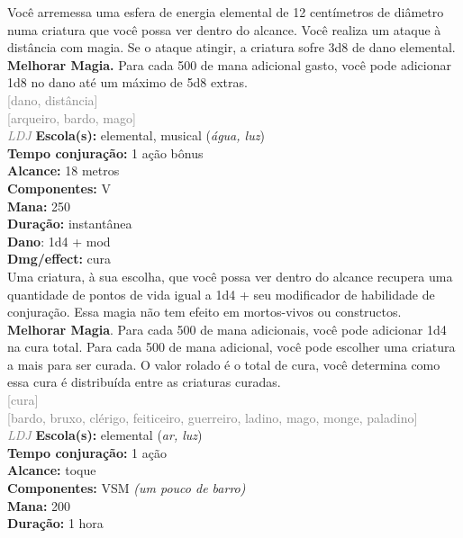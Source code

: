 \documentclass{RPG_Adventure}[2021/10/20]
\begin{document}
{\normalsize Você arremessa uma esfera de energia elemental de 12 centímetros de diâmetro numa criatura que você possa ver dentro do alcance. Você realiza um ataque à distância com magia. Se o ataque atingir, a criatura sofre 3d8 de dano elemental.\\\t \textbf{Melhorar Magia.} Para cada 500 de mana adicional gasto, você pode adicionar 1d8 no dano até um máximo de 5d8 extras.\\}
{\scriptsize \textcolor{gray}{[dano, distância]\\}}
{\scriptsize \textcolor{gray}{[arqueiro, bardo, mago]\\}}
{\tiny \textcolor{gray}{\textit{LDJ}}}
{\small \t \textbf{Escola(s):} elemental, musical (\textit{água, luz})\\\t \textbf{Tempo conjuração:} 1 ação bônus\\\t \textbf{Alcance:} 18 metros\\\t \textbf{Componentes:} V\\\t \textbf{Mana:} 250\\\t \textbf{Duração:} instantânea\\\t \textbf{Dano}: 1d4 + mod\\\t \textbf{Dmg/effect:} cura\\}
{\normalsize Uma criatura, à sua escolha, que você possa ver dentro do alcance recupera uma quantidade de pontos de vida igual a 1d4 + seu modificador de habilidade de conjuração. Essa magia não tem efeito em mortos-vivos ou constructos.\\\t \textbf{Melhorar Magia}. Para cada 500 de mana adicionais, você pode adicionar 1d4 na cura total. Para cada 500 de mana adicional, você pode escolher uma criatura a mais para ser curada. O valor rolado é o total de cura, você determina como essa cura é distribuída entre as criaturas curadas.\\}
{\scriptsize \textcolor{gray}{[cura]\\}}
{\scriptsize \textcolor{gray}{[bardo, bruxo, clérigo, feiticeiro, guerreiro, ladino, mago, monge, paladino]\\}}
{\tiny \textcolor{gray}{\textit{LDJ}}}
{\small \t \textbf{Escola(s):} elemental (\textit{ar, luz})\\\t \textbf{Tempo conjuração:} 1 ação\\\t \textbf{Alcance:} toque\\\t \textbf{Componentes:} VSM \textit{(um pouco de barro)}\\\t \textbf{Mana:} 200\\\t \textbf{Duração:} 1 hora\\}
\end{document}
